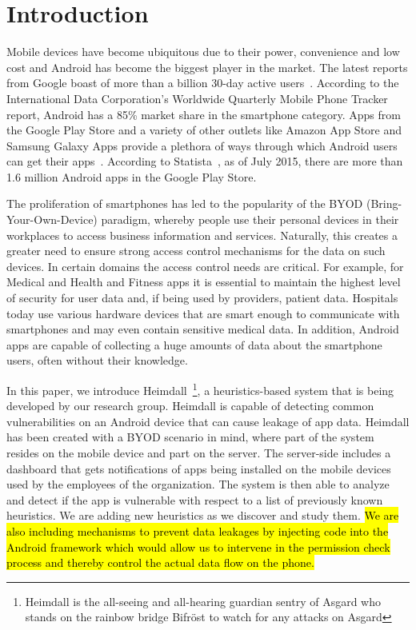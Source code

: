 \section{Introduction}
\label{intro}
Mobile devices have become ubiquitous due to their power, convenience
and low cost and Android has become the biggest player in the market. The latest reports from Google boast of more than a billion 30-day active users~\cite{Engadget_market_share}. According to the International Data Corporation's Worldwide Quarterly Mobile Phone Tracker report, Android has a 85\% market share in the smartphone category. Apps from the Google Play Store and a variety of other outlets like Amazon App Store and Samsung Galaxy Apps provide a plethora of ways through which Android users can get their apps~\cite{Online_App_Stores}. According to Statista~\cite{Android_app_number}, as of July 2015, there are more than 1.6 million Android apps in the Google Play Store.

The proliferation of smartphones has led to the popularity of the BYOD (Bring-Your-Own-Device) paradigm, whereby people use their personal devices in their workplaces to access business information and services. Naturally, this creates a greater need to ensure strong access control mechanisms for the data on such devices. In certain domains the access control needs are critical. For example, for Medical and Health and Fitness apps it is essential to maintain the highest level of security for user data and, if being used by providers, patient data. Hospitals today use various hardware devices that are smart enough to communicate with smartphones and may even contain sensitive medical data. In addition, Android apps are capable of collecting a huge amounts of data about the smartphone users, often without their knowledge.

In this paper, we introduce Heimdall~\footnote{Heimdall is the all-seeing and all-hearing guardian sentry of Asgard who stands on the rainbow bridge Bifr\"{o}st to watch for any attacks on Asgard}, a heuristics-based system that is being developed by our research group. Heimdall is capable of detecting common vulnerabilities on an Android device that can cause leakage of app data. Heimdall has been created with a BYOD scenario in mind, where part of the system resides on the mobile device and part on the server. The server-side includes a dashboard that gets notifications of apps being installed on the mobile devices used by the employees of the organization. The system is then able to analyze and detect if the app is vulnerable with respect to a list of previously known heuristics. We are adding new heuristics as we discover and study them. \hl{We are also including mechanisms to prevent data leakages by injecting code into the Android framework which would allow us to intervene in the permission check process and thereby control the actual data flow on the phone.}

